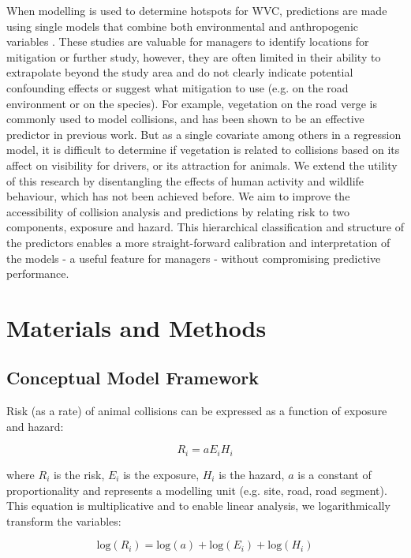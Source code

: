 When modelling is used to determine hotspots for WVC, predictions are made using single models that combine both environmental and anthropogenic variables \citep{malo04,ramp05,gome08,roge09,hoth12,bart14,meis14,snow14}. These studies are valuable for managers to identify locations  for mitigation or further study, however, they are often limited in their ability to extrapolate beyond the study area and do not clearly indicate potential confounding effects or suggest what mitigation to use (e.g. on the road environment or on the species). For example, vegetation on the road verge is commonly used to model collisions, and has been shown to be an effective predictor in previous work.  But as a single covariate among others in a regression model, it is difficult to determine if vegetation is related to collisions based on its affect on visibility for drivers, or its attraction for animals. We extend the utility of this research by disentangling the effects of human activity and wildlife behaviour, which has not been achieved before. We aim to improve the accessibility of collision analysis and predictions by relating risk to two components, exposure and hazard. This hierarchical classification and structure of the predictors enables a more straight-forward calibration and interpretation of the models - a useful feature for managers - without compromising predictive performance.

\section{Materials and Methods}

\subsection{Conceptual Model Framework}
Risk (as a rate) of animal collisions can be expressed as a function of exposure and hazard: 


\begin{equation} \label{eq:21}
R_i=aE_iH_i
\end{equation}

where $R_i$ is the risk, $E_i$ is the exposure, $H_i$ is the hazard, $a$ is a constant of proportionality and represents a modelling unit (e.g. site, road, road segment). This equation is multiplicative and to enable linear analysis, we logarithmically transform the variables: 

\begin{equation} \label{eq:22}
\text{log}(R_i)=\text{log}(a)+\text{log}(E_i)+\text{log}(H_i)
\end{equation}

